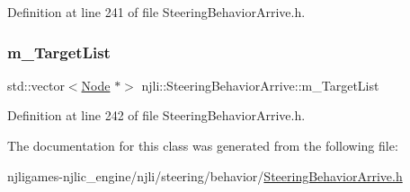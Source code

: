 Definition at line 241 of file Steering\+Behavior\+Arrive.\+h.

\mbox{\label{classnjli_1_1_steering_behavior_arrive_a0e8b5e159c8ad606a7fae7e2ad67b1af}} 
\subsubsection{\texorpdfstring{m\+\_\+\+Target\+List}{m\_TargetList}}
{\footnotesize\ttfamily std\+::vector$<$\mbox{\hyperlink{classnjli_1_1_node}{Node}} $\ast$$>$ njli\+::\+Steering\+Behavior\+Arrive\+::m\+\_\+\+Target\+List\hspace{0.3cm}{\ttfamily [private]}}



Definition at line 242 of file Steering\+Behavior\+Arrive.\+h.



The documentation for this class was generated from the following file\+:\begin{DoxyCompactItemize}
\item 
njligames-\/njlic\+\_\+engine/njli/steering/behavior/\mbox{\hyperlink{_steering_behavior_arrive_8h}{Steering\+Behavior\+Arrive.\+h}}\end{DoxyCompactItemize}
